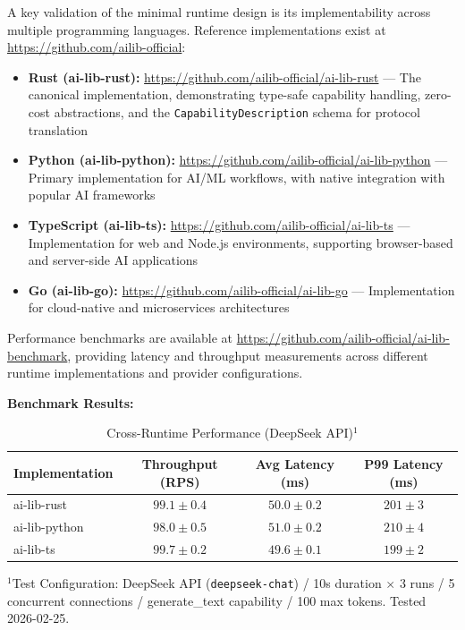 A key validation of the minimal runtime design is its implementability across multiple programming languages. Reference implementations exist at \url{https://github.com/ailib-official}:
\begin{itemize}
    \item \textbf{Rust (ai-lib-rust):} \url{https://github.com/ailib-official/ai-lib-rust} --- The canonical implementation, demonstrating type-safe capability handling, zero-cost abstractions, and the \texttt{CapabilityDescription} schema for protocol translation
    \item \textbf{Python (ai-lib-python):} \url{https://github.com/ailib-official/ai-lib-python} --- Primary implementation for AI/ML workflows, with native integration with popular AI frameworks
    \item \textbf{TypeScript (ai-lib-ts):} \url{https://github.com/ailib-official/ai-lib-ts} --- Implementation for web and Node.js environments, supporting browser-based and server-side AI applications
    \item \textbf{Go (ai-lib-go):} \url{https://github.com/ailib-official/ai-lib-go} --- Implementation for cloud-native and microservices architectures
\end{itemize}

Performance benchmarks are available at \url{https://github.com/ailib-official/ai-lib-benchmark}, providing latency and throughput measurements across different runtime implementations and provider configurations.

\textbf{Benchmark Results:}

\begin{table}[htbp]
\centering
\caption{Cross-Runtime Performance (DeepSeek API)$^{1}$}
\label{tab:benchmark1}
\begin{tabular}{lccc}
\toprule
\textbf{Implementation} & \textbf{Throughput (RPS)} & \textbf{Avg Latency (ms)} & \textbf{P99 Latency (ms)} \\
\midrule
ai-lib-rust & $99.1 \pm 0.4$ & $50.0 \pm 0.2$ & $201 \pm 3$ \\
ai-lib-python & $98.0 \pm 0.5$ & $51.0 \pm 0.2$ & $210 \pm 4$ \\
ai-lib-ts & $99.7 \pm 0.2$ & $49.6 \pm 0.1$ & $199 \pm 2$ \\
\bottomrule
\end{tabular}

\vspace{0.3em}
\footnotesize{$^{1}$Test Configuration: DeepSeek API (\texttt{deepseek-chat}) / 10s duration $\times$ 3 runs / 5 concurrent connections / generate\_text capability / 100 max tokens. Tested 2026-02-25.}
\end{table}

